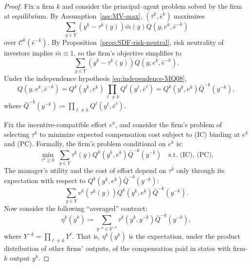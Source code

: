 \documentclass[11pt,a4paper,oneside]{book}
\def\geq{\geqslant}
\theoremstyle{plain}
\theoremstyle{definition}
\theoremstyle{remark}
\numberwithin{equation}{chapter}
\begin{document}
\begin{proof}
Fix a firm $k$ and consider the principal--agent problem solved by the firm at equilibrium.
By Assumption~\ref{ass:MV-max}, $(\bar{\tau}^k, \bar{e}^k)$ maximizes
\begin{equation*}
  \sum_{y \in Y} (y^k - \tau^k(y)) \bar{m}(y) Q(y, e^k, \bar{e}^{-k})
\end{equation*}
over $\mathcal{C}^k(\bar{e}^{-k})$.
By Proposition~\ref{prop:SDF-risk-neutral}, risk neutrality of investors implies $\bar{m} \equiv 1$, so the firm's objective simplifies to
\begin{equation*}
  \sum_{y \in Y} (y^k - \tau^k(y)) Q(y, e^k, \bar{e}^{-k}).
\end{equation*}
Under the independence hypothesis \eqref{eq:independence-MQ08},
\begin{equation*}
  Q(y, e^k, \bar{e}^{-k}) = Q^k(y^k, e^k) \prod_{\ell \neq k} Q^\ell(y^\ell, \bar{e}^\ell) = Q^k(y^k, e^k) \bar{Q}^{-k}(y^{-k}),
\end{equation*}
where $\bar{Q}^{-k}(y^{-k}) \coloneqq \prod_{\ell \neq k} Q^\ell(y^\ell, \bar{e}^\ell)$.

Fix the incentive-compatible effort $e^k$, and consider the firm's problem of selecting $\tau^k$ to minimize expected compensation cost subject to (IC) binding at $e^k$ and (PC).
Formally, the firm's problem conditional on $e^k$ is:
\begin{equation*}
  \min_{\tau^k \geq 0} \; \sum_{y \in Y} \tau^k(y) Q^k(y^k, e^k) \bar{Q}^{-k}(y^{-k})
  \quad \text{s.t. (IC), (PC).}
\end{equation*}
The manager's utility and the cost of effort depend on $\tau^k$ only through its expectation with respect to $Q^k(y^k, e^k) \bar{Q}^{-k}(y^{-k})$:
\begin{equation*}
  \sum_{y \in Y} v^k(\tau^k(y)) Q^k(y^k, e^k) \bar{Q}^{-k}(y^{-k}).
\end{equation*}
Now consider the following ``averaged'' contract:
\begin{equation}\label{eq:averaged-contract}
  \eta^k(y^k) \coloneqq \sum_{y^{-k} \in Y^{-k}} \tau^k(y^k, y^{-k}) \bar{Q}^{-k}(y^{-k}),
\end{equation}
where $Y^{-k} = \prod_{\ell \neq k} Y^\ell$.
That is, $\eta^k(y^k)$ is the expectation, under the product distribution of other firms' outputs, of the compensation paid in states with firm-$k$ output $y^k$.


\end{proof}
\end{document}
